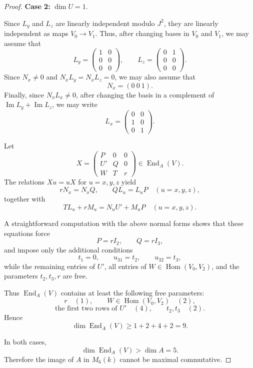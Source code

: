 \documentclass[11pt]{article}
\DeclareMathOperator{\End}{End}
\DeclareMathOperator{\Hom}{Hom}
\theoremstyle{plain}
\theoremstyle{remark}
\begin{document}
\begin{proof}
	\medskip
	\noindent
	\textbf{Case 2:} $\dim U=1$.
	
	Since $L_y$ and $L_z$ are linearly independent modulo $J^2$, they are linearly independent as maps
	$V_0\to V_1$. Thus, after changing bases in $V_0$ and $V_1$, we may assume that
	\[
	L_y=
	\begin{pmatrix}
		1&0\\
		0&0\\
		0&0
	\end{pmatrix},
	\qquad
	L_z=
	\begin{pmatrix}
		0&1\\
		0&0\\
		0&0
	\end{pmatrix}.
	\]
	Since $N_x\neq 0$ and $N_xL_y=N_xL_z=0$, we may also assume that
	\[
	N_x=(0\ 0\ 1).
	\]
	Finally, since $N_xL_x\neq 0$, after changing the basis in a complement of
	$\operatorname{Im}L_y+\operatorname{Im}L_z$, we may write
	\[
	L_x=
	\begin{pmatrix}
		0&0\\
		1&0\\
		0&1
	\end{pmatrix}.
	\]
	
	Let
	\[
	X=
	\begin{pmatrix}
		P&0&0\\
		U'&Q&0\\
		W&T&r
	\end{pmatrix}\in \End_A(V).
	\]
	The relations $Xu=uX$ for $u=x,y,z$ yield
	\[
	rN_x=N_xQ,\qquad QL_u=L_uP\quad (u=x,y,z),
	\]
	together with
	\[
	TL_u+rM_u=N_uU'+M_uP\quad (u=x,y,z).
	\]
	
	A straightforward computation with the above normal forms shows that these equations force
	\[
	P=rI_2,\qquad Q=rI_3,
	\]
	and impose only the additional conditions
	\[
	t_1=0,\qquad u_{31}=t_2,\qquad u_{32}=t_3,
	\]
	while the remaining entries of $U'$, all entries of $W\in\Hom(V_0,V_2)$, and the parameters
	$t_2,t_3,r$ are free.
	
	Thus $\End_A(V)$ contains at least the following free parameters:
	\[
	r \quad (1),\qquad W\in \Hom(V_0,V_2)\quad (2),
	\]
	\[
	\text{the first two rows of }U' \quad (4),\qquad t_2,t_3 \quad (2).
	\]
	Hence
	\[
	\dim\End_A(V)\ge 1+2+4+2=9.
	\]
	
	In both cases,
	\[
	\dim\End_A(V)>\dim A=5.
	\]
	Therefore the image of $A$ in $M_6(k)$ cannot be maximal commutative.
\end{proof}
\end{document}
